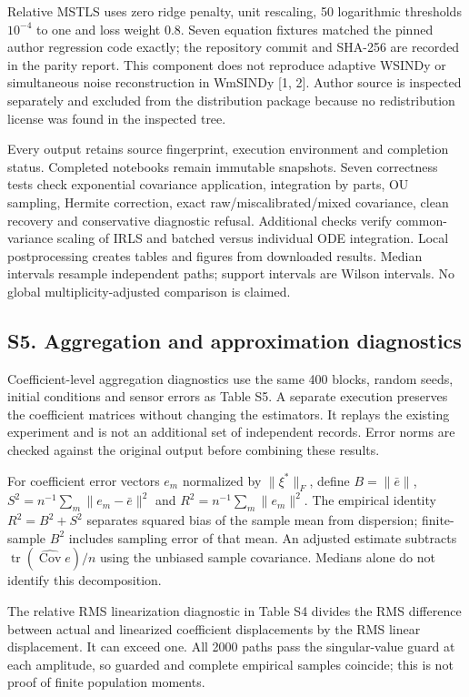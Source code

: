 \documentclass[
  american,
  11pt,
]{article}
\begin{document}
Relative MSTLS uses zero ridge penalty, unit rescaling, 50 logarithmic
thresholds \(10^{-4}\) to one and loss weight 0.8. Seven equation
fixtures matched the pinned author regression code exactly; the
repository commit and SHA-256 are recorded in the parity report. This
component does not reproduce adaptive WSINDy or simultaneous noise
reconstruction in WmSINDy {[}1, 2{]}. Author source is inspected
separately and excluded from the distribution package because no
redistribution license was found in the inspected tree.

Every output retains source fingerprint, execution environment and
completion status. Completed notebooks remain immutable snapshots. Seven
correctness tests check exponential covariance application, integration
by parts, OU sampling, Hermite correction, exact raw/miscalibrated/mixed
covariance, clean recovery and conservative diagnostic refusal.
Additional checks verify common-variance scaling of IRLS and batched
versus individual ODE integration. Local postprocessing creates tables
and figures from downloaded results. Median intervals resample
independent paths; support intervals are Wilson intervals. No global
multiplicity-adjusted comparison is claimed.

\subsection{S5. Aggregation and approximation
diagnostics}\label{s5.-aggregation-and-approximation-diagnostics}

Coefficient-level aggregation diagnostics use the same 400 blocks,
random seeds, initial conditions and sensor errors as Table S5. A
separate execution preserves the coefficient matrices without changing
the estimators. It replays the existing experiment and is not an
additional set of independent records. Error norms are checked against
the original output before combining these results.

For coefficient error vectors \(e_m\) normalized by \(\|\xi^*\|_F\),
define \(B=\|\bar e\|\), \(S^2=n^{-1}\sum_m\|e_m-\bar e\|^2\) and
\(R^2=n^{-1}\sum_m\|e_m\|^2\). The empirical identity \(R^2=B^2+S^2\)
separates squared bias of the sample mean from dispersion; finite-sample
\(B^2\) includes sampling error of that mean. An adjusted estimate
subtracts \(\operatorname{tr}(\widehat{\operatorname{Cov}}e)/n\) using
the unbiased sample covariance. Medians alone do not identify this
decomposition.

The relative RMS linearization diagnostic in Table S4 divides the RMS
difference between actual and linearized coefficient displacements by
the RMS linear displacement. It can exceed one. All 2000 paths pass the
singular-value guard at each amplitude, so guarded and complete
empirical samples coincide; this is not proof of finite population
moments.
\end{document}
